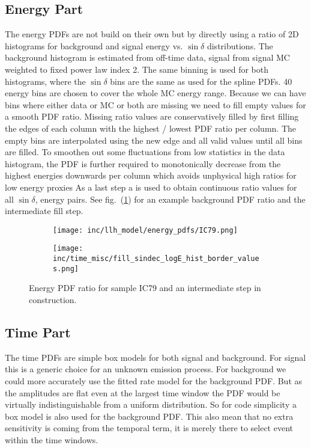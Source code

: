 \subsection{Energy Part}
The energy PDFs are not build on their own but by directly using a ratio of 2D histograms for background and signal energy vs. $\sin\delta$ distributions.
The background histogram is estimated from off-time data, signal from signal MC weighted to fixed power law index 2.
The same binning is used for both histograms, where the $\sin\delta$ bins are the same as used for the spline PDFs.
40 energy bins are chosen to cover the whole MC energy range.
Because we can have bins where either data or MC or both are missing we need to fill empty values for a smooth PDF ratio.
Missing ratio values are conservatively filled by first filling the edges of each column with the highest / lowest PDF ratio per column.
The empty bins are interpolated using the new edge and all valid values until all bins are filled.
To smoothen out some fluctuations from low statistics in the data histogram, the PDF is further required to monotonically decrease from the highest energies downwards per column which avoids unphysical high ratios for low energy proxies
As a last step a  is used to obtain continuous ratio values for all $\sin\delta$, energy pairs.
See fig.~(\ref{fig:energy_pdf_ratios}) for an example background PDF ratio and the intermediate fill step.

\begin{figure}[h]
  \centering
  \begin{subfigure}[c]{0.49\textwidth}
    \texttt{[image: inc/llh\_model/energy\_pdfs/IC79.png]}
  \end{subfigure}
  \hfill
  \begin{subfigure}[c]{0.49\textwidth}
    \texttt{[image: inc/time\_misc/fill\_sindec\_logE\_hist\_border\_values.png]}
  \end{subfigure}
  \caption{Energy PDF ratio for sample IC79 and an intermediate step in construction.}
  \label{fig:energy_pdf_ratios}
\end{figure}


\subsection{Time Part}
The time PDFs are simple box models for both signal and background.
For signal this is a generic choice for an unknown emission process.
For background we could more accurately use the fitted rate model for the background PDF.
But as the amplitudes are flat even at the largest time window the PDF would be virtually indistinguishable from a uniform distribution.
So for code simplicity a box model is also used for the background PDF.
This also mean that no extra sensitivity is coming from the temporal term, it is merely there to select event within the time windows.

